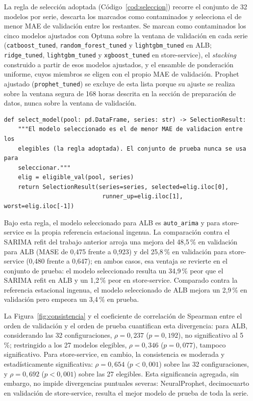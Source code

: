 La regla de selección adoptada (Código~\ref{cod:seleccion}) recorre el conjunto de 32 modelos por serie,
descarta los marcados como contaminados y selecciona el de menor MAE de validación entre los restantes.
Se marcan como contaminados los cinco modelos ajustados con Optuna sobre la ventana de validación en cada
serie (\texttt{catboost\_tuned}, \texttt{random\_forest\_tuned} y \texttt{lightgbm\_tuned} en ALB;
\texttt{ridge\_tuned}, \texttt{lightgbm\_tuned} y \texttt{xgboost\_tuned} en store-service), el
\emph{stacking} construido a partir de esos modelos ajustados, y el ensamble de ponderación uniforme, cuyos
miembros se eligen con el propio MAE de validación. Prophet ajustado (\texttt{prophet\_tuned}) se excluye de
esta lista porque su ajuste se realiza sobre la ventana segura de 168 horas descrita en la sección de
preparación de datos, nunca sobre la ventana de validación.

\begin{lstlisting}[caption={Regla de selección: menor MAE de validación entre los modelos elegibles (\texttt{tsa\_final/selection.py}).}, label=cod:seleccion]
def select_model(pool: pd.DataFrame, series: str) -> SelectionResult:
    """El modelo seleccionado es el de menor MAE de validacion entre los
    elegibles (la regla adoptada). El conjunto de prueba nunca se usa para
    seleccionar."""
    elig = eligible_val(pool, series)
    return SelectionResult(series=series, selected=elig.iloc[0],
                            runner_up=elig.iloc[1], worst=elig.iloc[-1])
\end{lstlisting}

Bajo esta regla, el modelo seleccionado para ALB es \texttt{auto\_arima} y para store-service es la propia
referencia estacional ingenua. La comparación contra el SARIMA refit del trabajo anterior arroja una mejora
del 48,5\,\% en validación para ALB (MASE de 0,475 frente a 0,923) y del 25,8\,\% en validación para
store-service (0,480 frente a 0,647); en ambos casos, esa ventaja se revierte en el conjunto de prueba: el
modelo seleccionado resulta un 34,9\,\% peor que el SARIMA refit en ALB y un 1,2\,\% peor en store-service.
Comparado contra la referencia estacional ingenua, el modelo seleccionado de ALB mejora un 2,9\,\% en
validación pero empeora un 3,4\,\% en prueba.

La Figura~\ref{fig:consistencia} y el coeficiente de correlación de Spearman entre el orden de validación y
el orden de prueba cuantifican esta divergencia: para ALB, considerando las 32 configuraciones, $\rho=0,237$
($p=0,192$), no significativo al 5\,\%; restringido a los 27 modelos elegibles, $\rho=0,346$ ($p=0,077$),
tampoco significativo. Para store-service, en cambio, la consistencia es moderada y estadísticamente
significativa: $\rho=0,654$ ($p<0,001$) sobre las 32 configuraciones, y $\rho=0,692$ ($p<0,001$) sobre las
27 elegibles. Esta significancia agregada, sin embargo, no impide divergencias puntuales severas: NeuralProphet,
decimocuarto en validación de store-service, resulta el mejor modelo de prueba de toda la serie.

